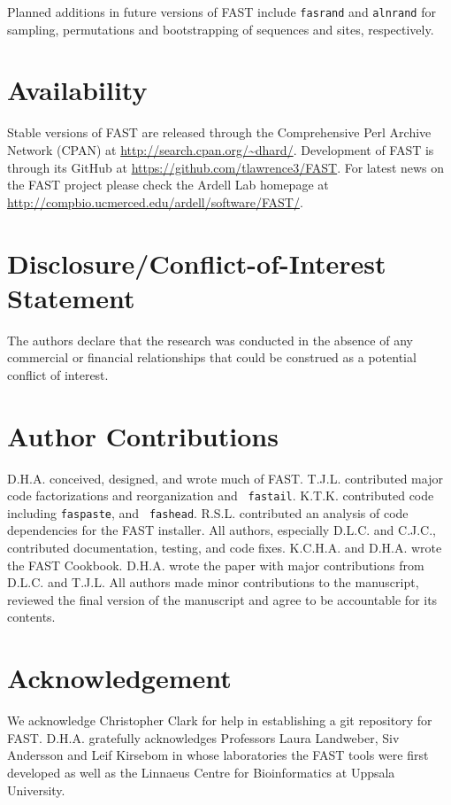 \documentclass{frontiersSCNS} %
\begin{document}
Planned additions in future versions of FAST include {\tt fasrand} and
{\tt alnrand} for sampling, permutations and bootstrapping of
sequences and sites, respectively.

\section*{Availability}

Stable versions of FAST are released through the Comprehensive Perl
Archive Network (CPAN) at
\url{http://search.cpan.org/~dhard/}. Development of FAST is through
its GitHub at \url{https://github.com/tlawrence3/FAST}. For latest
news on the FAST project please check the Ardell Lab homepage at
\url{http://compbio.ucmerced.edu/ardell/software/FAST/}.

\section*{Disclosure/Conflict-of-Interest Statement}

The authors declare that the research was conducted in the absence of
any commercial or financial relationships that could be construed as a
potential conflict of interest.

\section*{Author Contributions}

D.H.A. conceived, designed, and wrote much of FAST. T.J.L. contributed
major code factorizations and reorganization and {\tt
  fastail}. K.T.K. contributed code including {\tt faspaste}, and {\tt
  fashead}. R.S.L. contributed an analysis of code dependencies for
the FAST installer. All authors, especially D.L.C. and C.J.C.,
contributed documentation, testing, and code fixes. K.C.H.A. and
D.H.A. wrote the FAST Cookbook. D.H.A. wrote the paper with major
contributions from D.L.C. and T.J.L. All authors made minor
contributions to the manuscript, reviewed the final version of the
manuscript and agree to be accountable for its contents.

\section*{Acknowledgement}
We acknowledge Christopher Clark for help in establishing a git
repository for FAST. D.H.A. gratefully acknowledges Professors Laura
Landweber, Siv Andersson and Leif Kirsebom in whose laboratories the
FAST tools were first developed as well as the Linnaeus Centre for
Bioinformatics at Uppsala University.
\end{document}
